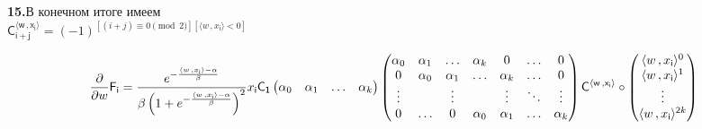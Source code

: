 \documentclass[a4paper,12pt]{article}
\begin{document}
\noindent\textbf{15.}В конечном итоге имеем\\

 $\mathsf{C^{\langle w \,, x_{\mathsf{i}}\rangle}_{i + j}} = (-1)^{[(i + j) \equiv 0 \pmod{2}][\langle w \,, x_{\mathsf{i}}\rangle < 0]}$

\begin{displaymath}
    {\partial\over{\partial w}} \mathsf{F_i} = {e^{-{\langle w \,, x_{\mathsf{i}}\rangle - \alpha\over{\beta}}}\over{\beta\left(1 + e^{-{\langle w \,, x_{\mathsf{i}}\rangle - \alpha\over{\beta}}}\right)^2}} x_{\mathsf{i}} \mathsf{C_1} \begin{pmatrix}
        \alpha_0 & \alpha_1 & \ldots & \alpha_k \\
    \end{pmatrix} \begin{pmatrix}
        \alpha_0 & \alpha_1 & \ldots & \alpha_k & 0 & \ldots & 0 \\
        0 & \alpha_0 & \alpha_1 & \ldots & \alpha_k & \ldots & 0 \\
        \vdots &  & \vdots &  & \vdots & \ddots & \vdots\\
        0 & \ldots & 0 & \alpha_0 & \alpha_1 &\ldots & \alpha_k \\
    \end{pmatrix} \mathsf{C^{\langle w \,, x_{\mathsf{i}}\rangle}}\circ \begin{pmatrix}
        \langle w \,, x_{\mathsf{i}}\rangle^{0} \\ \langle w \,, x_{\mathsf{i}}\rangle^{1} \\ \vdots \\ \langle w \,, x_{\mathsf{i}}\rangle^{\mathsf{2}k} \\
    \end{pmatrix}
\end{displaymath}\\
\end{document}

